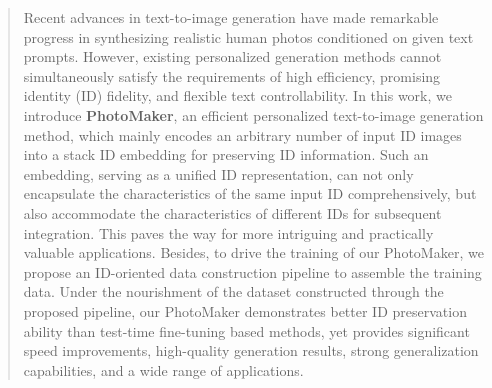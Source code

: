 \begin{abstract}
Recent advances in text-to-image generation have made remarkable progress in synthesizing realistic human photos conditioned on given text prompts. 
However, existing personalized generation methods cannot simultaneously satisfy the requirements of high efficiency, promising identity (ID) fidelity, and flexible text controllability.
In this work, we introduce \textbf{PhotoMaker}, an efficient personalized text-to-image generation method, which mainly encodes an arbitrary number of input ID images into a stack ID embedding for preserving ID information.
Such an embedding, serving as a unified ID representation, can not only encapsulate the characteristics of the same input ID comprehensively, but also accommodate the characteristics of different IDs for subsequent integration.
This paves the way for more intriguing and practically valuable applications.
Besides, to drive the training of our PhotoMaker, we propose an ID-oriented data construction pipeline to assemble the training data.
Under the nourishment of the dataset constructed through the proposed pipeline,
our PhotoMaker demonstrates better ID preservation ability than test-time fine-tuning based methods, yet provides significant speed improvements, high-quality generation results, strong generalization capabilities, and a wide range of applications. 
\vspace{-10pt}
\end{abstract}


